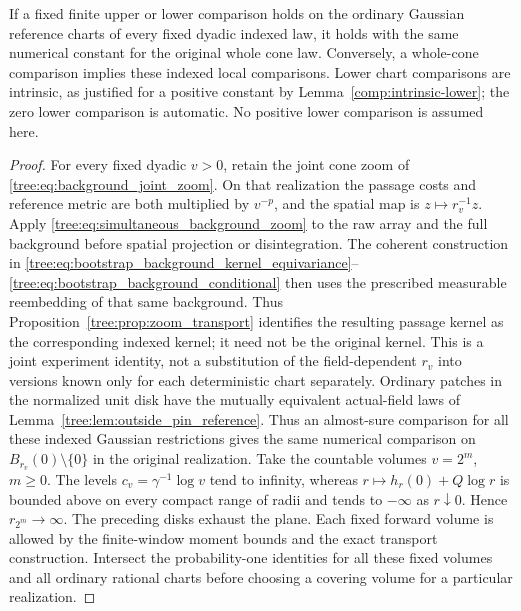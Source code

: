 \begin{lemma}
\label{tree:lem:comparison_atlas}
If a fixed finite upper or lower comparison holds on the ordinary
Gaussian reference charts of every fixed dyadic indexed law, it holds
with the same numerical constant for the original whole cone law.
Conversely, a whole-cone comparison implies these indexed local
comparisons. Lower chart comparisons are intrinsic, as justified for
a positive constant by Lemma~\ref{comp:intrinsic-lower}; the zero lower
comparison is automatic. No positive lower comparison is assumed here.
\end{lemma}

\begin{proof}
For every fixed dyadic $v>0$, retain the
joint cone zoom of \eqref{tree:eq:background_joint_zoom}. On that
realization the passage costs and reference metric are both multiplied
by $v^{-p}$, and the spatial map is $z\mapsto r_v^{-1}z$.
Apply \eqref{tree:eq:simultaneous_background_zoom} to the raw array
and the full background before spatial projection or disintegration.
The coherent construction in
\eqref{tree:eq:bootstrap_background_kernel_equivariance}--\eqref{tree:eq:bootstrap_background_conditional}
then uses the prescribed measurable reembedding of that same background.
Thus Proposition~\ref{tree:prop:zoom_transport} identifies the resulting
passage kernel as the corresponding indexed kernel; it need not be
the original kernel. This is a joint experiment identity, not a
substitution of the field-dependent $r_v$ into versions known only
for each deterministic chart separately. Ordinary patches in the normalized unit disk
have the mutually equivalent actual-field laws of
Lemma~\ref{tree:lem:outside_pin_reference}.
Thus an almost-sure comparison for all these indexed Gaussian
restrictions gives the same numerical comparison on
$B_{r_v}(0)\setminus\{0\}$ in the original realization.
Take the countable volumes $v=2^m$, $m\ge0$. The levels
$c_v=\gamma^{-1}\log v$ tend to infinity, whereas
$r\mapsto h_r(0)+Q\log r$ is bounded above on every compact range
of radii and tends to $-\infty$ as $r\downarrow0$.
Hence $r_{2^m}\to\infty$. The preceding disks exhaust the plane.
Each fixed forward volume is allowed by the finite-window moment
bounds and the exact transport construction. Intersect the
probability-one identities for all these fixed volumes and all
ordinary rational charts before choosing a covering volume for
a particular realization.


\end{proof}
